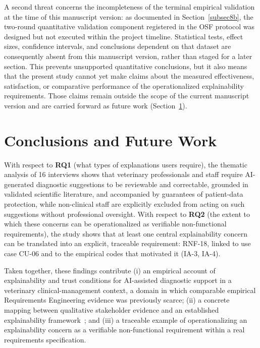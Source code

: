 \documentclass[pdflatex,sn-mathphys-num,Numbered]{sn-jnl}
\begin{document}
A second threat concerns the incompleteness of the terminal empirical validation at the time of this manuscript version: as documented in Section~\ref{subsec8b}, the two-round quantitative validation component registered in the OSF protocol was designed but not executed within the project timeline. Statistical tests, effect sizes, confidence intervals, and conclusions dependent on that dataset are consequently absent from this manuscript version, rather than staged for a later section. This prevents unsupported quantitative conclusions, but it also means that the present study cannot yet make claims about the measured effectiveness, satisfaction, or comparative performance of the operationalized explainability requirements. Those claims remain outside the scope of the current manuscript version and are carried forward as future work (Section~\ref{sec7}).


\section{Conclusions and Future Work}\label{sec7}

With respect to \textbf{RQ1} (what types of explanations users require), the thematic analysis of 16 interviews shows that veterinary professionals and staff require AI-generated diagnostic suggestions to be reviewable and correctable, grounded in validated scientific literature, and accompanied by guarantees of patient-data protection, while non-clinical staff are explicitly excluded from acting on such suggestions without professional oversight. With respect to \textbf{RQ2} (the extent to which these concerns can be operationalized as verifiable non-functional requirements), the study shows that at least one central explainability concern can be translated into an explicit, traceable requirement: RNF-18, linked to use case CU-06 and to the empirical codes that motivated it (IA-3, IA-4).

Taken together, these findings contribute (i) an empirical account of explainability and trust conditions for AI-assisted diagnostic support in a veterinary clinical-management context, a domain in which comparable empirical Requirements Engineering evidence was previously scarce; (ii) a concrete mapping between qualitative stakeholder evidence and an established explainability framework~\cite{chazette2020,chazette2021,chazette2022}; and (iii) a traceable example of operationalizing an explainability concern as a verifiable non-functional requirement within a real requirements specification.
\end{document}
